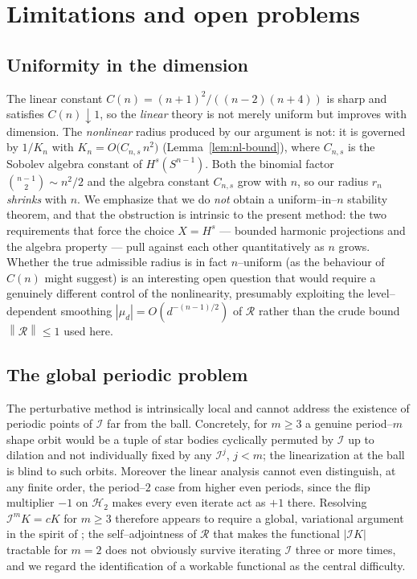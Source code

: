 \documentclass[11pt,reqno]{amsart}
\theoremstyle{plain}
\theoremstyle{definition}
\newcommand{\Sph}{S^{n-1}}
\newcommand{\Rad}{\mathcal{R}}
\newcommand{\IB}{\mathcal{I}}
\newcommand{\Hd}[1]{\mathcal{H}_{#1}}
\newcommand{\norm}[1]{\left\lVert #1 \right\rVert}
\newcommand{\abs}[1]{\left\lvert #1 \right\rvert}
\begin{document}
\section{Limitations and open problems}\label{sec:open}

\subsection{Uniformity in the dimension}
The linear constant $C(n)=(n+1)^2/((n-2)(n+4))$ is sharp and satisfies
$C(n)\downarrow1$, so the \emph{linear} theory is not merely uniform but
improves with dimension. The \emph{nonlinear} radius produced by our argument
is not: it is governed by $1/K_n$ with $K_n=O\big(C_{n,s}\,n^2\big)$
(Lemma~\ref{lem:nl-bound}), where $C_{n,s}$ is the Sobolev algebra constant of
$H^s(\Sph)$. Both the binomial factor $\binom{n-1}{2}\sim n^2/2$ and the
algebra constant $C_{n,s}$ grow with $n$, so our radius $r_n$ \emph{shrinks}
with $n$. We emphasize that we do \emph{not} obtain a uniform--in--$n$ stability
theorem, and that the obstruction is intrinsic to the present method: the two
requirements that force the choice $X=H^s$ --- bounded harmonic projections and
the algebra property --- pull against each other quantitatively as $n$ grows.
Whether the true admissible radius is in fact $n$--uniform (as the behaviour of
$C(n)$ might suggest) is an interesting open question that would require a
genuinely different control of the nonlinearity, presumably exploiting the
level--dependent smoothing $\abs{\mu_d}=O(d^{-(n-1)/2})$ of $\Rad$ rather than
the crude bound $\norm{\Rad}\le1$ used here.

\subsection{The global periodic problem}
The perturbative method is intrinsically local and cannot address the existence
of periodic points of $\IB$ far from the ball. Concretely, for $m\ge3$ a
genuine period--$m$ shape orbit would be a tuple of star bodies cyclically
permuted by $\IB$ up to dilation and not individually fixed by any $\IB^j$,
$j<m$; the linearization at the ball is blind to such orbits. Moreover the
linear analysis cannot even distinguish, at any finite order, the period--$2$
case from higher even periods, since the flip multiplier $-1$ on $\Hd2$ makes
every even iterate act as $+1$ there. Resolving $\IB^mK=cK$ for $m\ge3$
therefore appears to require a global, variational argument in the spirit of
\cite{MSY2025}; the self--adjointness of $\Rad$ that makes the functional
$\abs{\IB K}$ tractable for $m=2$ does not obviously survive iterating $\IB$
three or more times, and we regard the identification of a workable functional
as the central difficulty.
\end{document}
